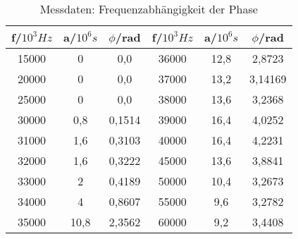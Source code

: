 \begin{table}[h!]
  \centering
  \caption{Messdaten: Frequenzabhängigkeit der Phase}
  \label{tab:Phasen}
  \begin{tabular}{c c c c c c}
    \toprule
f/$10^{3}Hz$ & a/$10^{6}s$ & $\phi$/rad  &  f/$10^{3}Hz$ & a/$10^{6}s$ & $\phi$/rad\\
    \midrule
    15000 &	0     & 0,0      &    36000 &	12,8  & 2,8723   \\
    20000 &	0     & 0,0      &    37000 &	13,2  & 3,14169  \\
    25000 &	0     & 0,0      &    38000 &	13,6  & 3,2368   \\
    30000 &	0,8   & 0,1514   &    39000 &	16,4  & 4,0252   \\
    31000 &	1,6   & 0,3103   &    40000 &	16,4  & 4,2231   \\
    32000 &	1,6   & 0,3222   &    45000 &	13,6  & 3,8841   \\
    33000 &	2     & 0,4189   &    50000 &	10,4  & 3,2673   \\
    34000 &	4     & 0,8607   &    55000 &	9,6   & 3,2782   \\
    35000 &	10,8  & 2,3562   &    60000 &	9,2   & 3,4408   \\
    \bottomrule
  \end{tabular}
\end{table}

